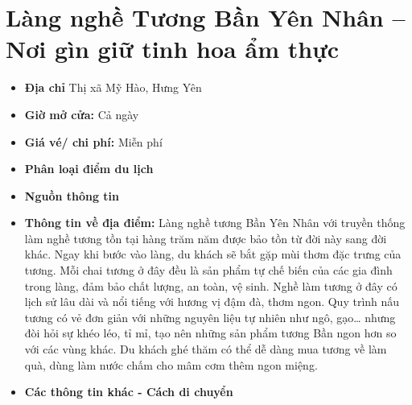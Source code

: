 \documentclass{article}
\begin{document}
\section{Làng nghề Tương Bần Yên Nhân – Nơi gìn giữ tinh hoa ẩm thực}
\begin{itemize}
    \item{\textbf{Địa chỉ}} Thị xã Mỹ Hào, Hưng Yên

    \item{\textbf{Giờ mở cửa:}} Cả ngày

    \item{\textbf{Giá vé/ chi phí:}} Miễn phí

    \item{\textbf{Phân loại điểm du lịch}}

    \item{\textbf{Nguồn thông tin}}

    \item{\textbf{Thông tin về địa điểm:}} Làng nghề tương Bần Yên Nhân với truyền thống làm nghề tương tồn tại hàng trăm năm được bảo tồn từ đời này sang đời khác. Ngay khi bước vào làng, du khách sẽ bắt gặp mùi thơm đặc trưng của tương. Mỗi chai tương ở đây đều là sản phẩm tự chế biến của các gia đình trong làng, đảm bảo chất lượng, an toàn, vệ sinh. Nghề làm tương ở đây có lịch sử lâu dài và nổi tiếng với hương vị đậm đà, thơm ngon. Quy trình nấu tương có vẻ đơn giản với những nguyên liệu tự nhiên như ngô, gạo… nhưng đòi hỏi sự khéo léo, tỉ mỉ, tạo nên những sản phẩm tương Bần ngon hơn so với các vùng khác. Du khách ghé thăm có thể dễ dàng mua tương về làm quà, dùng làm nước chấm cho mâm cơm thêm ngon miệng.
\end{itemize}

\begin{itemize}
    \item{\textbf{Các thông tin khác - Cách di chuyển}}
\end{itemize}
\end{document}
